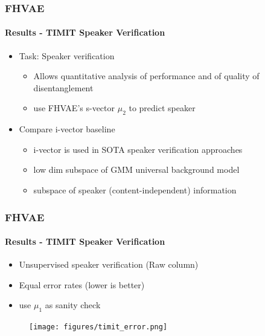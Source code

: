 \documentclass[9pt]{beamer}
\begin{document}
\begin{frame}
\frametitle{FHVAE}
\framesubtitle{Results - TIMIT Speaker Verification} %
\begin{itemize}
	\item Task: Speaker verification
	\begin{itemize}
		\item Allows quantitative analysis of performance and of quality of disentanglement
		\item use FHVAE's s-vector $\mu_2$ to predict speaker
	\end{itemize}
	\item Compare i-vector baseline
	\begin{itemize}
		\item i-vector is used in SOTA speaker verification approaches
		\item low dim subspace of GMM universal background model
		\item subspace of speaker (content-independent) information
	\end{itemize}
\end{itemize}
\end{frame} 


\begin{frame}
\frametitle{FHVAE}
\framesubtitle{Results - TIMIT Speaker Verification} %
\begin{itemize}
	\item Unsupervised speaker verification (Raw column)
	\item Equal error rates (lower is better)
	\item use $\mu_1$ as sanity check
\end{itemize}
\begin{figure}
	\texttt{[image: figures/timit\_error.png]}
\end{figure}
\end{frame} 
\end{document}
